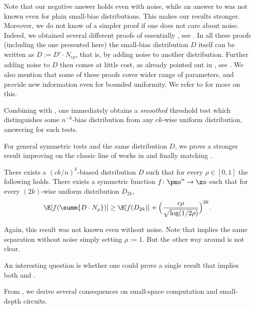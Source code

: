 Note that our negative answer holds even with noise, while an answer to  was not known even for plain small-bias distributions. This makes our results stronger.  Moreover, we do not know of a simpler proof if one does not care about noise.  Indeed, we obtained several different proofs of essentially , see \cite{SSS-II}.  In all these proofs (including the one presented here) the small-bias distribution $D$ itself can be written as $D := D' \cdot N_{c \rho}$, that is, by adding noise to another distribution.  Further adding noise to $D$ then comes at little cost, as already pointed out in \cite{LV-sum}, see .  We also mention that some of these proofs cover wider range of parameters, and provide new information even for bounded uniformity.  We refer to \cite{SSS-II} for more on this.

Combining  with , one immediately obtains a \emph{smoothed} threshold test which distinguishes some $n^{-k}$-bias distribution from any $ck$-wise uniform distribution, answering  for such tests.

For general symmetric tests and the same distribution $D$, we prove a stronger result improving on the classic line of works in \cite{AGM03,AlonAKMRX07,OZ18} and finally 
matching .

\begin{theorem} \label{thm:sbpn-vs-k-wise}
  There exists a $(ck/n)^k$-biased distribution $D$ such that 
  for every $\rho \in [0,1]$ the following holds.
  There exists a symmetric function $f\colon\pmo^n \to \zo$ such that for every $(2k)$-wise uniform distribution $D_{2k}$,
  \[
    \E[ f(\summ{D \cdot N_\rho}) ] \ge \E[f(D_{2k})] + \Bigl(\frac{c\rho}{\sqrt{\log(1/2\rho)}}\Bigr)^{2k}.
  \]
\end{theorem}
Again, this result was not known even without noise.  Note that  implies the same separation without noise simply setting $\rho := 1$.  But the other way around is not clear.

An interesting question is whether one could prove a single result that implies both  and .

From , we derive several consequences on small-space computation and small-depth circuits.

